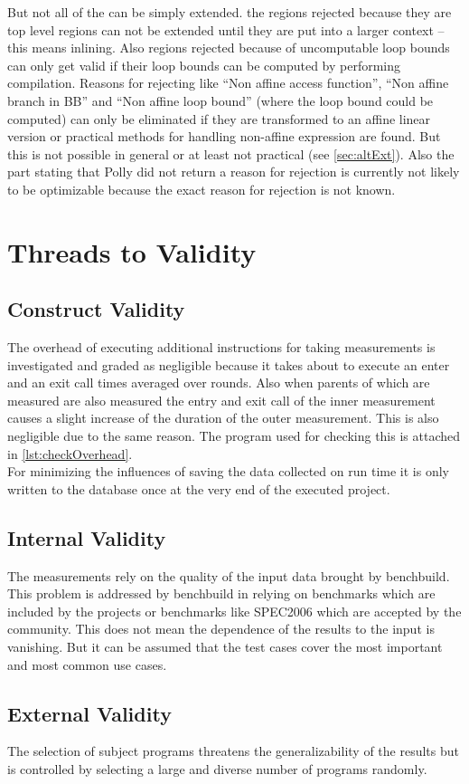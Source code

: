 But not all of the \scops can be simply extended.
\Eg the regions rejected because they are top level regions can not be extended until they are put into a larger context -- this means inlining.
Also regions rejected because of uncomputable loop bounds can only get valid if their loop bounds can be computed \eg by performing \jit compilation.
Reasons for rejecting like \enquote{Non affine access function}, \enquote{Non affine branch in BB} and \enquote{Non affine loop bound} (where the loop bound could be computed) can only be eliminated if they are transformed to an affine linear version or practical methods for handling non-affine expression are found.
But this is not possible in general or at least not practical (see \autoref{sec:altExt}).
Also the part stating that Polly did not return a reason for rejection is currently not likely to be optimizable because the exact reason for rejection is not known.

\section{Threads to Validity}
\subsection{Construct Validity}
The overhead of executing additional instructions for taking measurements is investigated and graded as negligible because it takes about \measurementOverhead to execute an enter and an exit call \overheadIterations times averaged over \overheadRounds rounds.
Also when parents of \scops which are measured are also measured the entry and exit call of the inner measurement causes a slight increase of the duration of the outer measurement.
This is also negligible due to the same reason.
The program used for checking this is attached in \autoref{lst:checkOverhead}.\\
For minimizing the influences of saving the data collected on run time it is only written to the database once at the very end of the executed project.\\
\subsection{Internal Validity}
The measurements rely on the quality of the input data brought by benchbuild.
This problem is addressed by benchbuild in relying on benchmarks which are included by the projects or benchmarks like SPEC2006 which are accepted by the community.
This does not mean the dependence of the results to the input is vanishing.
But it can be assumed that the test cases cover the most important and most common use cases.
\subsection{External Validity}
The selection of subject programs threatens the generalizability of the results but is controlled by selecting a large and diverse number of programs randomly.
